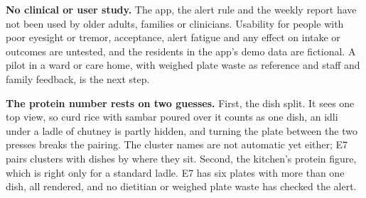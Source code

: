 \textbf{No clinical or user study.} The app, the alert rule and the weekly
report have not been used by older adults, families or clinicians. Usability
for people with poor eyesight or tremor, acceptance, alert fatigue and any
effect on intake or outcomes are untested, and the residents in the app's demo
data are fictional. A pilot in a ward or care home, with weighed plate waste as
reference and staff and family feedback, is the next step.

\textbf{The protein number rests on two guesses.} First, the dish split. It
sees one top view, so curd rice with sambar poured over it counts as one dish,
an idli under a ladle of chutney is partly hidden, and turning the plate
between the two presses breaks the pairing. The cluster names are not automatic
yet either; E7 pairs clusters with dishes by where they sit. Second, the
kitchen's protein figure, which is right only for a standard ladle. E7 has six
plates with more than one dish, all rendered, and no dietitian or weighed plate
waste has checked the alert.
